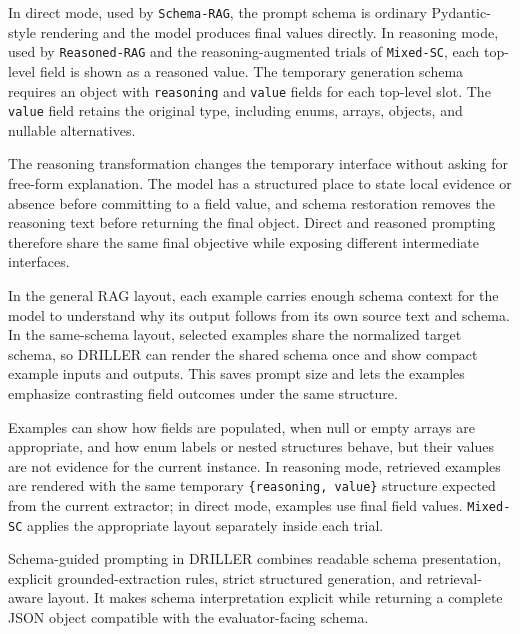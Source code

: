 In direct mode, used by \texttt{Schema-RAG}, the prompt schema is ordinary Pydantic-style rendering and the model produces final values directly. In reasoning mode, used by \texttt{Reasoned-RAG} and the reasoning-augmented trials of \texttt{Mixed-SC}, each top-level field is shown as a reasoned value. The temporary generation schema requires an object with \texttt{reasoning} and \texttt{value} fields for each top-level slot. The \texttt{value} field retains the original type, including enums, arrays, objects, and nullable alternatives.

The reasoning transformation changes the temporary interface without asking for free-form explanation. The model has a structured place to state local evidence or absence before committing to a field value, and schema restoration removes the reasoning text before returning the final object. Direct and reasoned prompting therefore share the same final objective while exposing different intermediate interfaces.

In the general RAG layout, each example carries enough schema context for the model to understand why its output follows from its own source text and schema. In the same-schema layout, selected examples share the normalized target schema, so DRILLER can render the shared schema once and show compact example inputs and outputs. This saves prompt size and lets the examples emphasize contrasting field outcomes under the same structure.

Examples can show how fields are populated, when null or empty arrays are appropriate, and how enum labels or nested structures behave, but their values are not evidence for the current instance. In reasoning mode, retrieved examples are rendered with the same temporary \texttt{\{reasoning, value\}} structure expected from the current extractor; in direct mode, examples use final field values. \texttt{Mixed-SC} applies the appropriate layout separately inside each trial.

Schema-guided prompting in DRILLER combines readable schema presentation, explicit grounded-extraction rules, strict structured generation, and retrieval-aware layout. It makes schema interpretation explicit while returning a complete JSON object compatible with the evaluator-facing schema.
